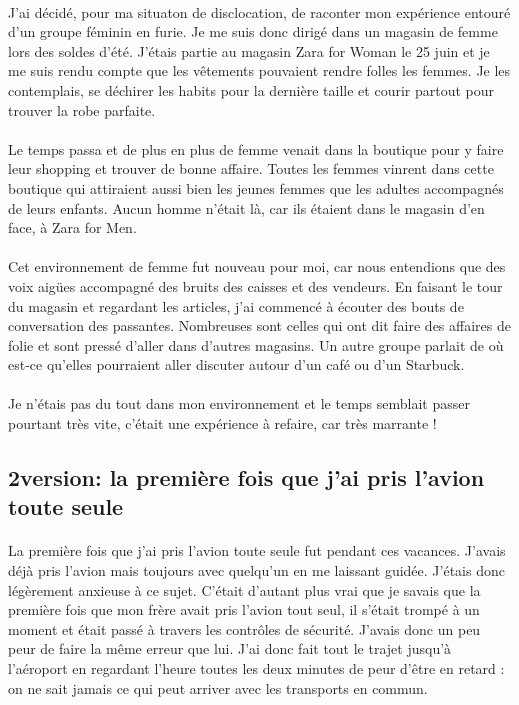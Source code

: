 \paragraph{}
J'ai décidé, pour ma situaton de disclocation, de raconter mon
expérience entouré d'un groupe féminin en furie. Je me suis donc
dirigé dans un magasin de femme lors des soldes d'été. J'étais partie
au magasin Zara for Woman le 25 juin et je me suis rendu compte que
les vêtements pouvaient rendre folles les femmes. Je les contemplais,
se déchirer les habits pour la dernière taille et courir partout pour
trouver la robe parfaite.
\paragraph{}
Le temps passa et de plus en plus de femme venait dans la boutique
pour y faire leur shopping et trouver de bonne affaire. Toutes les
femmes vinrent dans cette boutique qui attiraient aussi bien les jeunes
femmes que les adultes accompagnés de leurs enfants. Aucun homme
n'était là, car ils étaient dans le magasin d'en face, à Zara for Men.
\paragraph{}
Cet environnement de femme fut nouveau pour moi, car nous
entendions que des voix aigües accompagné des bruits des caisses et
des vendeurs. En faisant le tour du magasin et regardant les articles,
j'ai commencé à écouter des bouts de conversation des passantes.
Nombreuses sont celles qui ont dit faire des affaires de folie et sont
pressé d'aller dans d'autres magasins. Un autre groupe parlait de où
est-ce qu'elles pourraient aller discuter autour d'un café ou d'un
Starbuck.
\paragraph{}
Je n’étais pas du tout dans mon environnement et le temps semblait
passer pourtant très vite, c’était une expérience à refaire, car très
marrante !

\subsection{2\ieme version: la première fois que j’ai pris l’avion toute seule}
\paragraph{}
La première fois que j’ai pris l’avion toute seule fut pendant ces vacances. J’avais déjà pris l’avion mais toujours avec quelqu’un en me laissant guidée. J’étais donc légèrement anxieuse à ce sujet. C’était d’autant plus vrai que je savais que la première fois que mon frère avait pris l’avion tout seul, il s’était trompé à un moment et était passé à travers les contrôles de sécurité. J’avais donc un peu peur de faire la même erreur que lui. J’ai donc fait tout le trajet jusqu’à l’aéroport en regardant l’heure toutes les deux minutes de peur d’être en retard : on ne sait jamais ce qui peut arriver avec les transports en commun. 
